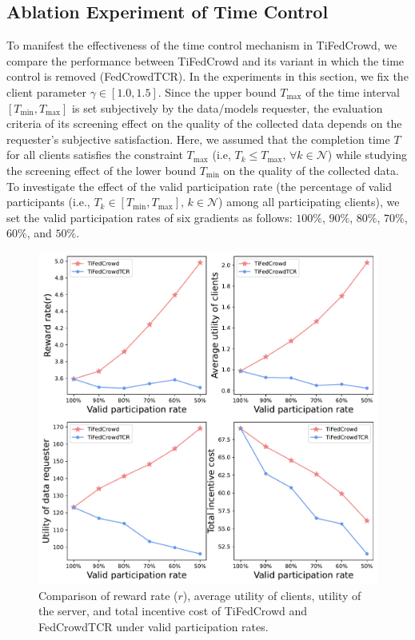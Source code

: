 \documentclass[final,1p,times]{elsarticle}
\begin{document}
\subsection{Ablation Experiment of Time Control}\label{RTTCM}
To manifest the effectiveness of the time control mechanism in TiFedCrowd, we compare the performance between TiFedCrowd and its variant in which the time control is removed (FedCrowdTCR). In the experiments in this section, we fix the client parameter $\gamma\in[1.0,1.5]$. Since the upper bound $T_{\max}$ of the time interval $[T_{\min},T_{\max}]$ is set subjectively by the data/models requester, the evaluation criteria of its screening effect on the quality of the collected data depends on the requester's subjective satisfaction. Here, we assumed that the completion time $T$ for all clients satisfies the constraint $T_{\max}$ (i.e, $T_k\le T_{\max},\,\forall k\in\bm{\mathcal{N}}$) while studying the screening effect of the lower bound $T_{\min}$ on the quality of the collected data. To investigate the effect of the valid participation rate (the percentage of valid participants (i.e., $T_k\in [T_{\min},T_{\max}],\, k\in\bm{\mathcal{N}}$) among all participating clients), we set the valid participation rates of six gradients as follows: $100\%$, $90\%$, $80\%$, $70\%$, $60\%$, and $50\%$.

\begin{figure}
	\centering
	\centerline{\includegraphics[width=5.5in]{fig4.pdf}}
	\caption{Comparison of reward rate ($r$), average utility of clients, utility of the server, and total incentive cost of TiFedCrowd and FedCrowdTCR under valid participation rates.}
	\label{fig:4}
\end{figure}
\end{document}
